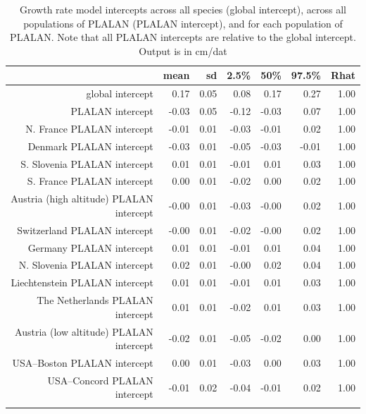 \documentclass[12pt]{article}\usepackage[]{graphicx}\usepackage[]{color}
\begin{document}
\begin{longtable}{rrrrrrr}
\caption{Growth rate model intercepts across all species (global intercept), across all populations of PLALAN (PLALAN intercept), and for each population of PLALAN. Note that all PLALAN intercepts are relative to the global intercept.  Output is in cm/dat} \\ 
  & mean & sd & 2.5\% & 50\% & 97.5\% & Rhat \\ 
  \hline
global intercept & 0.17 & 0.05 & 0.08 & 0.17 & 0.27 & 1.00 \\ 
  PLALAN intercept & -0.03 & 0.05 & -0.12 & -0.03 & 0.07 & 1.00 \\ 
  N. France PLALAN intercept & -0.01 & 0.01 & -0.03 & -0.01 & 0.02 & 1.00 \\ 
  Denmark PLALAN intercept & -0.03 & 0.01 & -0.05 & -0.03 & -0.01 & 1.00 \\ 
  S. Slovenia PLALAN intercept & 0.01 & 0.01 & -0.01 & 0.01 & 0.03 & 1.00 \\ 
  S. France PLALAN intercept & 0.00 & 0.01 & -0.02 & 0.00 & 0.02 & 1.00 \\ 
  Austria (high altitude) PLALAN intercept & -0.00 & 0.01 & -0.03 & -0.00 & 0.02 & 1.00 \\ 
  Switzerland PLALAN intercept & -0.00 & 0.01 & -0.02 & -0.00 & 0.02 & 1.00 \\ 
  Germany PLALAN intercept & 0.01 & 0.01 & -0.01 & 0.01 & 0.04 & 1.00 \\ 
  N. Slovenia PLALAN intercept & 0.02 & 0.01 & -0.00 & 0.02 & 0.04 & 1.00 \\ 
  Liechtenstein PLALAN intercept & 0.01 & 0.01 & -0.01 & 0.01 & 0.03 & 1.00 \\ 
  The Netherlands PLALAN intercept & 0.01 & 0.01 & -0.02 & 0.01 & 0.03 & 1.00 \\ 
  Austria (low altitude) PLALAN intercept & -0.02 & 0.01 & -0.05 & -0.02 & 0.00 & 1.00 \\ 
  USA--Boston PLALAN intercept & 0.00 & 0.01 & -0.03 & 0.00 & 0.03 & 1.00 \\ 
  USA--Concord PLALAN intercept & -0.01 & 0.02 & -0.04 & -0.01 & 0.02 & 1.00 \\ 
  \hline
\label{tab:mod_gr_intercept}
\end{longtable}
\end{document}

